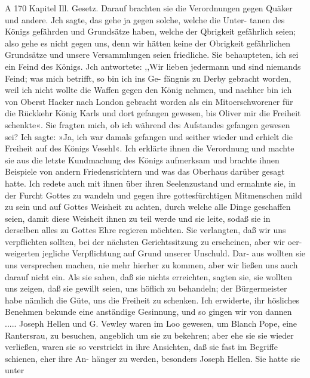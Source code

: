 A
170 Kapitel Ill.
Gesetz. Darauf brachten sie die Verordnungen gegen Quäker und
andere. Jch sagte, das gehe ja gegen solche, welche die Unter-
tanen des Königs gefährden und Grundsätze haben, welche der
Qbrigkeit gefährlich seien; also gehe es nicht gegen uns, denn wir
hätten keine der Obrigkeit gefährlichen Grundsätze und unsere
Versammlungen seien friedliche. Sie behaupteten, ich sei ein
Feind des Königs. Jch antwortete: ,,Wir lieben jedermann und
sind niemands Feind; was mich betrifft, so bin ich ins Ge-
fängnis zu Derby gebracht worden, weil ich nicht wollte die
Waffen gegen den König nehmen, und nachher bin ich von Oberst
Hacker nach London gebracht worden als ein Mitoerschworener
für die Rückkehr König Karls und dort gefangen gewesen, bis
Oliver mir die Freiheit schenkte«. Sie fragten mich, ob ich während
des Aufstandes gefangen gewesen sei? Ich sagte: »Ja, ich war
damals gefangen und seither wieder und erhielt die Freiheit auf
des Königs Vesehl«. Ich erklärte ihnen die Verordnung und
machte sie aus die letzte Kundmachung des Königs aufmerksam und
brachte ihnen Beispiele von andern Friedensrichtern und was
das Oberhaus darüber gesagt hatte. Ich redete auch mit
ihnen über ihren Seelenzustand und ermahnte sie, in der Furcht
Gottes zu wandeln und gegen ihre gottesfürchtigen Mitmenschen
mild zu sein und auf Gottes Weisheit zu achten, durch welche alle
Dinge geschaffen seien, damit diese Weisheit ihnen zu teil werde
und sie leite, sodaß sie in derselben alles zu Gottes Ehre
regieren möchten. Sie verlangten, daß wir uns verpflichten
sollten, bei der nächsten Gerichtssitzung zu erscheinen, aber wir oer-
weigerten jegliche Verpflichtung auf Grund unserer Unschuld. Dar-
aus wollten sie uns versprechen machen, nie mehr hierher zu
kommen, aber wir ließen uns auch darauf nicht ein. Als sie sahen,
daß sie nichts erreichten, sagten sie, sie wollten uns zeigen, daß
sie gewillt seien, uns höflich zu behandeln; der Bürgermeister habe
nämlich die Güte, uns die Freiheit zu schenken. Ich erwiderte,
ihr hösliches Benehmen bekunde eine anständige Gesinnung, und
so gingen wir von dannen .....
Joseph Hellen und G. Vewley waren im Loo gewesen, um
Blanch Pope, eine Rantersrau, zu besuchen, angeblich um sie zu
bekehren; aber ehe sie sie wieder verließen, waren sie so verstrickt
in ihre Ansichten, daß sie fast im Begriffe schienen, eher ihre An-
hänger zu werden, besonders Joseph Hellen. Sie hatte sie unter



